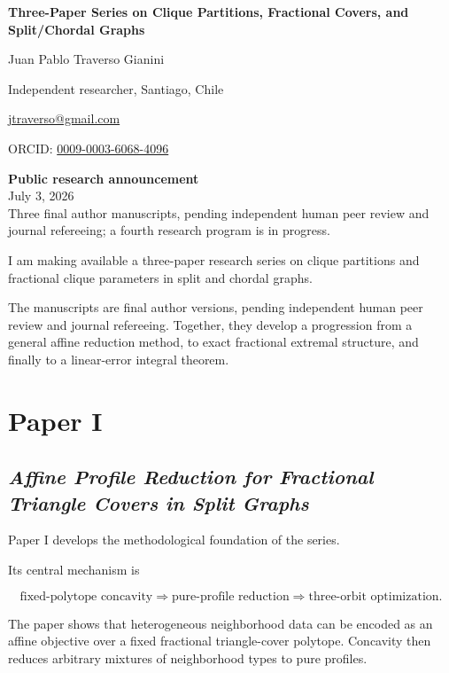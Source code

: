 \documentclass[11pt,a4paper]{article}
\newcommand{\statusblock}{%
\begin{center}
\small
\textbf{Public research announcement}\\
July 3, 2026\\
Three final author manuscripts, pending independent human peer review and journal refereeing; a fourth research program is in progress.
\end{center}}
\begin{document}
\begin{titlepage}
\centering
\vspace*{2.1cm}
{\sffamily\bfseries\fontsize{22}{27}\selectfont Three-Paper Series on Clique Partitions, Fractional Covers, and Split/Chordal Graphs\par}
\vspace{1.2cm}
{\Large Juan Pablo Traverso Gianini\par}
\vspace{0.35cm}
{\normalsize Independent researcher, Santiago, Chile\par}
\vspace{0.2cm}
{\normalsize \href{mailto:jtraverso@gmail.com}{jtraverso@gmail.com}\par}
{\normalsize ORCID: \href{https://orcid.org/0009-0003-6068-4096}{0009-0003-6068-4096}\par}
\vfill
\statusblock
\vfill
\end{titlepage}

\setcounter{page}{1}

I am making available a three-paper research series on clique partitions and fractional clique parameters in split and chordal graphs.

The manuscripts are final author versions, pending independent human peer review and journal refereeing. Together, they develop a progression from a general affine reduction method, to exact fractional extremal structure, and finally to a linear-error integral theorem.

\section{Paper I}

\subsection{\texorpdfstring{\emph{Affine Profile Reduction for Fractional Triangle Covers in Split Graphs}}{Affine Profile Reduction for Fractional Triangle Covers in Split Graphs}}

Paper I develops the methodological foundation of the series.

Its central mechanism is

\[
\text{fixed-polytope concavity}
\Longrightarrow
\text{pure-profile reduction}
\Longrightarrow
\text{three-orbit optimization}.
\]

The paper shows that heterogeneous neighborhood data can be encoded as an affine objective over a fixed fractional triangle-cover polytope. Concavity then reduces arbitrary mixtures of neighborhood types to pure profiles.
\end{document}
